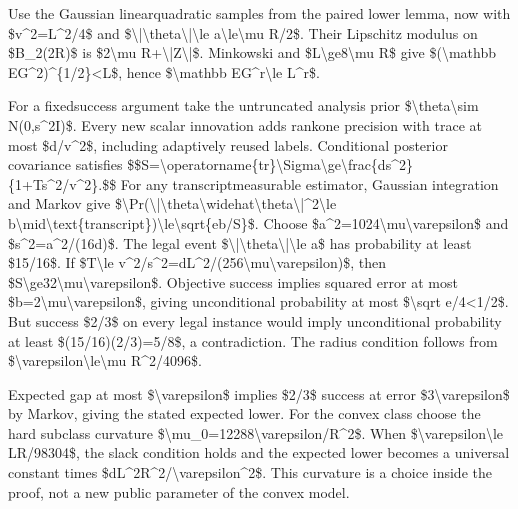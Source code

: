 \documentclass[10pt,a4paper]{article}
\begin{document}
Use the Gaussian linearquadratic samples from the paired lower lemma, now with \$v\textasciicircum{}2=L\textasciicircum{}2/4\$ and \$\textbackslash{}|\textbackslash{}theta\textbackslash{}|\textbackslash{}le a\textbackslash{}le\textbackslash{}mu R/2\$. Their Lipschitz modulus on \$B\_2(2R)\$ is \$2\textbackslash{}mu R+\textbackslash{}|Z\textbackslash{}|\$. Minkowski and \$L\textbackslash{}ge8\textbackslash{}mu R\$ give \$(\textbackslash{}mathbb EG\textasciicircum{}2)\textasciicircum{}\{1/2\}<L\$, hence \$\textbackslash{}mathbb EG\textasciicircum{}r\textbackslash{}le L\textasciicircum{}r\$.

For a fixedsuccess argument take the untruncated analysis prior \$\textbackslash{}theta\textbackslash{}sim N(0,s\textasciicircum{}2I)\$. Every new scalar innovation adds rankone precision with trace at most \$d/v\textasciicircum{}2\$, including adaptively reused labels. Conditional posterior covariance satisfies
\$\$S=\textbackslash{}operatorname\{tr\}\textbackslash{}Si\allowbreak{}gma\textbackslash{}ge\textbackslash{}frac\{ds\textasciicircum{}2\}\{1+Ts\textasciicircum{}2\allowbreak{}/v\textasciicircum{}2\}.\$\$
For any transcriptmeasurable estimator, Gaussian integration and Markov give \$\textbackslash{}Pr(\textbackslash{}|\textbackslash{}theta\textbackslash{}widehat\textbackslash{}theta\textbackslash{}|\textasciicircum{}2\textbackslash{}le b\textbackslash{}mid\textbackslash{}text\{transcript\})\textbackslash{}le\textbackslash{}sqrt\{eb/S\}\$. Choose \$a\textasciicircum{}2=1024\textbackslash{}mu\textbackslash{}varepsilon\$ and \$s\textasciicircum{}2=a\textasciicircum{}2/(16d)\$. The legal event \$\textbackslash{}|\textbackslash{}theta\textbackslash{}|\textbackslash{}le a\$ has probability at least \$15/16\$. If \$T\textbackslash{}le v\textasciicircum{}2/s\textasciicircum{}2=dL\textasciicircum{}2/(256\textbackslash{}mu\textbackslash{}varepsilon)\$, then \$S\textbackslash{}ge32\textbackslash{}mu\textbackslash{}varepsilon\$. Objective success implies squared error at most \$b=2\textbackslash{}mu\textbackslash{}varepsilon\$, giving unconditional probability at most \$\textbackslash{}sqrt e/4<1/2\$. But success \$2/3\$ on every legal instance would imply unconditional probability at least \$(15/16)(2/3)=5/8\$, a contradiction. The radius condition follows from \$\textbackslash{}varepsilon\textbackslash{}le\textbackslash{}mu R\textasciicircum{}2/4096\$.

Expected gap at most \$\textbackslash{}varepsilon\$ implies \$2/3\$ success at error \$3\textbackslash{}varepsilon\$ by Markov, giving the stated expected lower. For the convex class choose the hard subclass curvature \$\textbackslash{}mu\_0=12288\textbackslash{}varepsilon/R\textasciicircum{}2\$. When \$\textbackslash{}varepsilon\textbackslash{}le LR/98304\$, the slack condition holds and the expected lower becomes a universal constant times \$dL\textasciicircum{}2R\textasciicircum{}2/\textbackslash{}varepsilon\textasciicircum{}2\$. This curvature is a choice inside the proof, not a new public parameter of the convex model.
\end{document}
